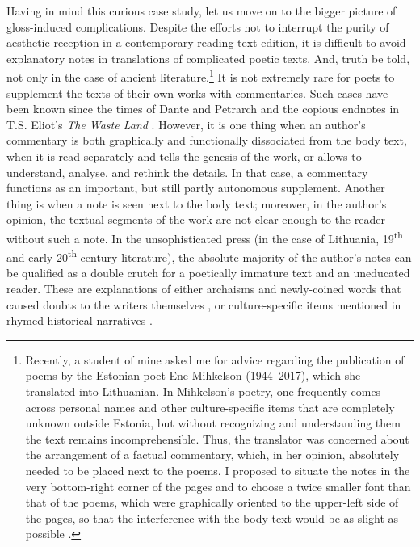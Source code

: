 \documentclass{article}
\begin{document}
Having in mind this curious case study, let us move on to the bigger
picture of gloss-induced complications. Despite the efforts not to
interrupt the purity of aesthetic reception in a contemporary reading
text edition, it is difficult to avoid explanatory notes in translations
of complicated poetic texts. And, truth be told, not only in the case of
ancient literature.\footnote{Recently, a student of mine asked me for
  advice regarding the publication of poems by the Estonian poet Ene
  Mihkelson (1944--2017), which she translated into Lithuanian. In
  Mihkelson's poetry, one frequently comes across personal names and
  other culture-specific items that are completely unknown outside
  Estonia, but without recognizing and understanding them the text
  remains incomprehensible. Thus, the translator was concerned about the
  arrangement of a factual commentary, which, in her opinion, absolutely
  needed to be placed next to the poems. I proposed to situate the notes
  in the very bottom-right corner of the pages and to choose a twice
  smaller font than that of the poems, which were graphically oriented
  to the upper-left side of the pages, so that the interference with the
  body text would be as slight as possible \citep{mihkelson_bokstas_2022}.} It is not extremely rare for poets to supplement the texts of their own works with
commentaries. Such cases have been known since the times of Dante and
Petrarch and the copious endnotes in T.S. Eliot's \emph{The Waste Land} \citep[28]{grafton_footnote_1997}. However, it is one thing when an author's commentary is both
graphically and functionally dissociated from the body text, when it is read
separately and tells the genesis of the work, or allows to understand, analyse, and rethink the details. In that case,
a commentary functions as an important, but still partly autonomous
supplement. Another thing is when a note is seen next to the body text;
moreover, in the author's opinion, the textual segments of the work are
not clear enough to the reader without such a note. In the
unsophisticated press (in the case of Lithuania, 19\textsuperscript{th} and early 20\textsuperscript{th}-century
literature), the absolute majority of the author's notes can be
qualified as a double crutch for a poetically immature text and an
uneducated reader. These are explanations of either archaisms and
newly-coined words that caused doubts to the writers themselves \citep[25 and 60]{maironis_pavasario_1905}, or culture-specific items mentioned in
rhymed historical narratives \citep[30--31]{maironis_pavasario_1913}.
\end{document}
